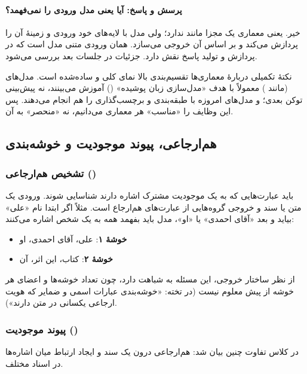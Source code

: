 \paragraph{پرسش و پاسخ: آیا  یعنی مدل ورودی را نمی‌فهمد؟} خیر.  یعنی معماری یک  مجزا مانند  ندارد؛ ولی مدل با لایه‌های خود ورودی و زمینهٔ آن را پردازش می‌کند و بر اساس آن خروجی می‌سازد.  همان ورودی متنی مدل است که در پردازش و تولید پاسخ نقش دارد. جزئیات  در جلسات بعد بررسی می‌شود.

\begin{correctionbox}{نکتهٔ تکمیلی دربارهٔ معماری‌ها}
تقسیم‌بندی بالا نمای کلی و ساده‌شده است. مدل‌های  (مانند ) معمولاً با هدف «مدل‌سازی زبان پوشیده» () آموزش می‌بینند، نه پیش‌بینی توکن بعدی؛ و مدل‌های  امروزه با  طبقه‌بندی و برچسب‌گذاری را هم انجام می‌دهند. پس این وظایف را «مناسب» هر معماری می‌دانیم، نه «منحصر» به آن.
\end{correctionbox}

\subsection{هم‌ارجاعی، پیوند موجودیت و خوشه‌بندی}
\subsubsection{تشخیص هم‌ارجاعی ()}
باید عبارت‌هایی که به یک موجودیت مشترک اشاره دارند شناسایی شوند. ورودی یک متن یا سند و خروجی گروه‌هایی از عبارت‌های هم‌ارجاع است. مثلاً اگر ابتدا نام «علی» بیاید و بعد «آقای احمدی» یا «او»، مدل باید بفهمد همه به یک شخص اشاره می‌کنند:
\begin{itemize}
  \item \textbf{خوشهٔ ۱}: علی، آقای احمدی، او
  \item \textbf{خوشهٔ ۲}: کتاب، این اثر، آن
\end{itemize}
از نظر ساختار خروجی، این مسئله به  شباهت دارد، چون تعداد خوشه‌ها و اعضای هر خوشه از پیش معلوم نیست (در تخته: «خوشه‌بندی عبارات اسمی و ضمایر که هویت ارجاعی یکسانی در متن دارند»).

\subsubsection{پیوند موجودیت ()}
در کلاس تفاوت چنین بیان شد: هم‌ارجاعی درون یک سند و  ایجاد ارتباط میان اشاره‌ها در اسناد مختلف.

